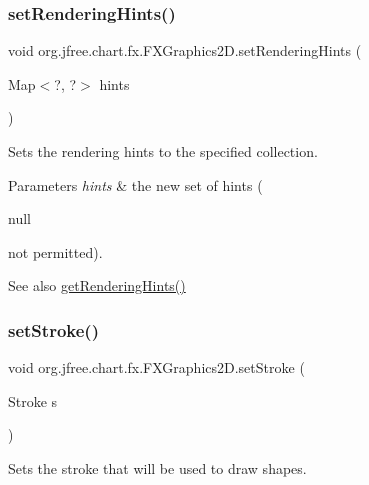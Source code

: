 \subsubsection{\texorpdfstring{set\+Rendering\+Hints()}{setRenderingHints()}}
{\footnotesize\ttfamily void org.\+jfree.\+chart.\+fx.\+F\+X\+Graphics2\+D.\+set\+Rendering\+Hints (\begin{DoxyParamCaption}\item[{Map$<$?, ?$>$}]{hints }\end{DoxyParamCaption})}

Sets the rendering hints to the specified collection.


\begin{DoxyParams}{Parameters}
{\em hints} & the new set of hints (
\begin{DoxyCode}
null 
\end{DoxyCode}
 not permitted).\\
\hline
\end{DoxyParams}
\begin{DoxySeeAlso}{See also}
\mbox{\hyperlink{classorg_1_1jfree_1_1chart_1_1fx_1_1_f_x_graphics2_d_a55636a4088737a9c9d29655b315d8085}{get\+Rendering\+Hints()}} 
\end{DoxySeeAlso}
\mbox{\label{classorg_1_1jfree_1_1chart_1_1fx_1_1_f_x_graphics2_d_ad92b82fa8bc1ea26d02986d9b0253506}} 
\subsubsection{\texorpdfstring{set\+Stroke()}{setStroke()}}
{\footnotesize\ttfamily void org.\+jfree.\+chart.\+fx.\+F\+X\+Graphics2\+D.\+set\+Stroke (\begin{DoxyParamCaption}\item[{Stroke}]{s }\end{DoxyParamCaption})}

Sets the stroke that will be used to draw shapes.


